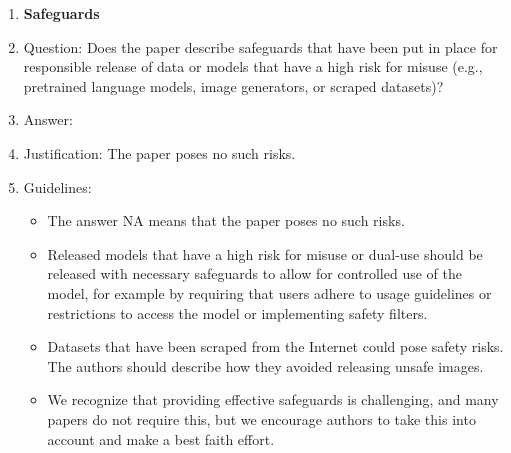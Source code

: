 \documentclass{article}
\begin{document}
{\begin{enumerate}
\item {\bf Safeguards}
    \item[] Question: Does the paper describe safeguards that have been put in place for responsible release of data or models that have a high risk for misuse (e.g., pretrained language models, image generators, or scraped datasets)?
    \item[] Answer: \answerNA{} %
    \item[] Justification: The paper poses no such risks.
    \item[] Guidelines:
    \begin{itemize}
        \item The answer NA means that the paper poses no such risks.
        \item Released models that have a high risk for misuse or dual-use should be released with necessary safeguards to allow for controlled use of the model, for example by requiring that users adhere to usage guidelines or restrictions to access the model or implementing safety filters. 
        \item Datasets that have been scraped from the Internet could pose safety risks. The authors should describe how they avoided releasing unsafe images.
        \item We recognize that providing effective safeguards is challenging, and many papers do not require this, but we encourage authors to take this into account and make a best faith effort.
    \end{itemize}


\end{enumerate}}
\end{document}
